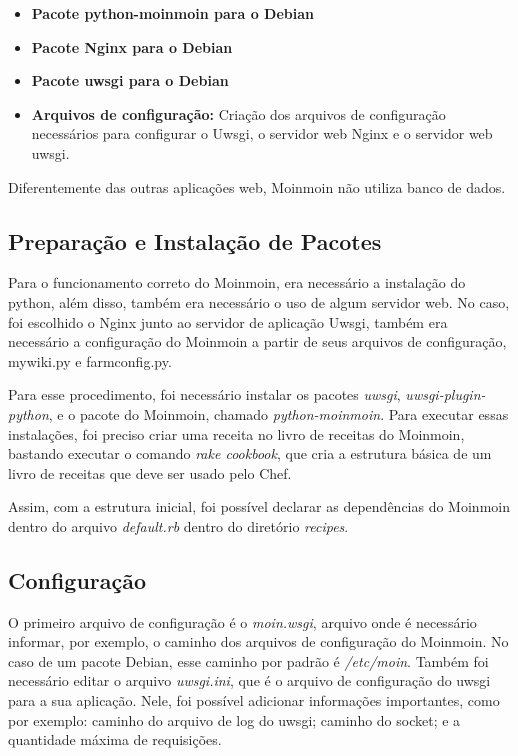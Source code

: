 \begin{itemize}
   \item \textbf{Pacote python-moinmoin para o Debian}
   \item \textbf{Pacote Nginx para o Debian}
   \item \textbf{Pacote uwsgi para o Debian}
   \item \textbf{Arquivos de configuração:} Criação dos arquivos de configuração
   necessários para configurar o Uwsgi, o servidor web Nginx e o servidor web
uwsgi.
\end{itemize}

Diferentemente das outras aplicações web, Moinmoin não utiliza banco de dados.

\subsection{Preparação e Instalação de Pacotes}

Para o funcionamento correto do Moinmoin, era necessário a instalação do python, além
disso, também era necessário o uso de algum servidor web. No caso, foi escolhido o Nginx
junto ao servidor de aplicação Uwsgi, também era necessário a configuração do 
Moinmoin a partir de seus
arquivos de configuração, mywiki.py e farmconfig.py.

Para esse procedimento, foi necessário instalar os pacotes \textit{uwsgi},
\textit{uwsgi-plugin-python}, e o pacote do Moinmoin, chamado \textit{python-moinmoin}.
Para executar essas instalações, foi preciso criar uma receita no livro de receitas
do Moinmoin, bastando executar o comando \textit{rake cookbook}, que cria a
estrutura básica de um livro de receitas que deve ser usado pelo Chef.

Assim, com a estrutura inicial, foi possível declarar as dependências do Moinmoin
dentro do arquivo \textit{default.rb} dentro do diretório \textit{recipes}.

\subsection{Configuração}

O primeiro arquivo de configuração é o \textit{moin.wsgi}, arquivo onde é necessário
informar, por exemplo, o caminho dos arquivos de configuração do Moinmoin. No caso
de um pacote Debian, esse caminho por padrão é  \textit{/etc/moin}. Também foi necessário 
editar o arquivo \textit{uwsgi.ini}, que é o arquivo de configuração
do uwsgi para a sua aplicação. Nele, foi possível adicionar informações importantes, como
por exemplo: caminho do arquivo de log do uwsgi; caminho do socket;
e a quantidade máxima de requisições.

